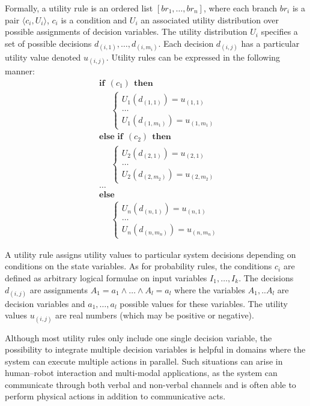 Formally, a utility rule is an ordered list $[ br_1, \dots, br_n]$, where each branch $br_i$ is a pair $\langle c_i, U_i \rangle$, $c_i$ is a condition and $U_i$ an associated utility distribution over possible assignments of decision variables. The utility distribution $U_i$ specifies a set of possible decisions $d_{(i,1)}, \dots, d_{(i,m_i)}$.  Each decision $d_{(i,j)}$ has a particular utility value denoted $u_{(i,j)}$.  Utility rules can be expressed in the following manner:
\begin{equation}
\begin{aligned}
& \textbf{if} \ \ (c_{1}) \ \ \textbf{then} \\ 
& \;\;\;\;\; \begin{cases}
U_1(d_{(1,1)}) = u_{(1,1)} \\
 \dots \\
U_1(d_{(1,m_1)}) = u_{(1,m_1)} 
\end{cases} \\[3mm]
& \textbf{else if} \ \ (c_{2}) \ \ \textbf{then} \\ 
& \;\;\;\;\; \begin{cases}
U_2(d_{(2,1)}) = u_{(2,1)} \\
 \dots \\
U_2(d_{(2,m_2)}) = u_{(2,m_2)} 
\end{cases} \\
& \dots  \\
& \textbf{else} \\
& \;\;\;\;\; \begin{cases}
U_n(d_{(n,1)}) = u_{(n,1)} \\
 \dots \\
U_n(d_{(n,m_n)}) = u_{(n,m_n)}
\end{cases}
\end{aligned}
\end{equation}

A utility rule assigns utility values to particular system decisions depending on conditions on the state variables.  As for probability rules, the conditions $c_i$ are defined as arbitrary logical formulae on input variables $I_1, \dots, I_k$.  The decisions $d_{(i,j)}$ are assignments $A_1\!=\!a_1 \land \dots \land A_{l}\!=\!a_{l}$ where the variables $A_1,..A_{l}$ are decision variables and $a_1, \dots, a_{l}$ possible values for these variables. The utility values $u_{(i,j)}$ are real numbers (which may be positive or negative).  

Although most utility rules only include one single decision variable, the possibility to integrate multiple decision variables is helpful in domains where the system can execute multiple actions in parallel. Such situations can arise in human--robot interaction and multi-modal applications, as the system can communicate through both verbal and non-verbal channels and is often able to perform physical actions in addition to communicative acts. 
 
